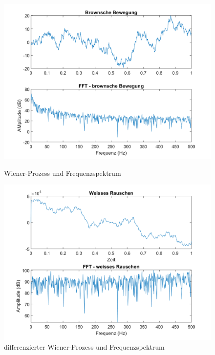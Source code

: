 \begin{figure}
	\centering
	\begin{minipage}{0.45\textwidth}
		\centering
		\includegraphics[width=\linewidth]{papers/brown/images/brownscheBewegungUndFFT.png}
		\caption{Wiener-Prozess und Frequenzspektrum}
		\label{brown:WienerProzessFFT}
	\end{minipage}
	\hspace{0.05\linewidth}
	\begin{minipage}{0.45\textwidth}
		\centering
		\includegraphics[width=\linewidth]{papers/brown/images/weissesRauschenDurchBrownUndFFT.png}
		\caption{differenzierter Wiener-Prozess und Frequenzspektrum}
		\label{brown:diffWienerFFT}
	\end{minipage}
\end{figure}


